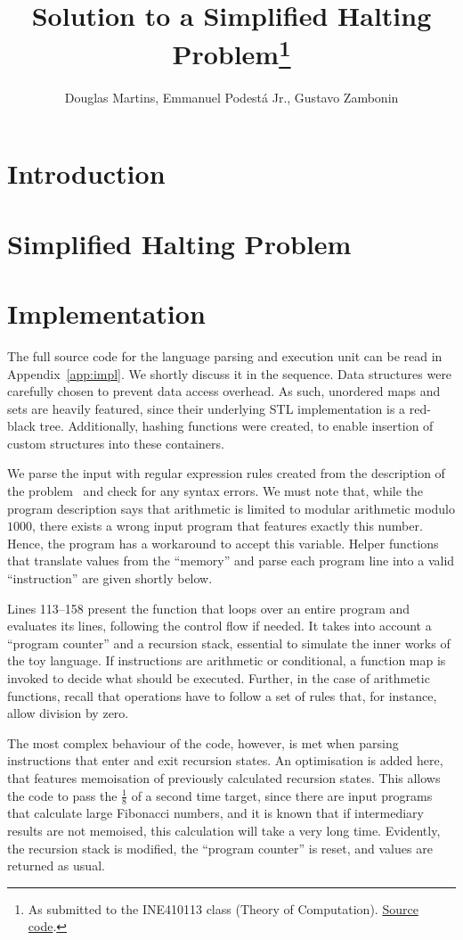 \documentclass[12pt]{article}
\title{Solution to a Simplified Halting Problem\footnote{
    As submitted to the INE410113 class (Theory of Computation). \href{https://github.com/zambonin/ine410113}{Source code}.}}
\author{Douglas Martins\inst{1}, Emmanuel Podestá Jr.\inst{1}, Gustavo Zambonin\inst{1}}
\begin{document}
 

\maketitle

\section{Introduction}\label{sec:intro}

\section{Simplified Halting Problem}\label{sec:halting}

\section{Implementation}\label{sec:imp}

The full source code for the language parsing and execution unit can be read in Appendix~\ref{app:impl}. We shortly discuss it in the sequence. Data structures were carefully chosen to prevent data access overhead. As such, unordered maps and sets are heavily featured, since their underlying STL implementation is a red-black tree. Additionally, hashing functions were created, to enable insertion of custom structures into these containers. 

We parse the input with regular expression rules created from the description of the problem~\cite{} and check for any syntax errors. We must note that, while the program description says that arithmetic is limited to modular arithmetic modulo $1000$, there exists a wrong input program that features exactly this number. Hence, the program has a workaround to accept this variable. Helper functions that translate values from the ``memory'' and parse each program line into a valid ``instruction'' are given shortly below.

Lines 113--158 present the function that loops over an entire program and evaluates its lines, following the control flow if needed. It takes into account a ``program counter'' and a recursion stack, essential to simulate the inner works of the toy language. If instructions are arithmetic or conditional, a function map is invoked to decide what should be executed. Further, in the case of arithmetic functions, recall that operations have to follow a set of rules that, for instance, allow division by zero.

The most complex behaviour of the code, however, is met when parsing instructions that enter and exit recursion states. An optimisation is added here, that features memoisation of previously calculated recursion states. This allows the code to pass the $\frac{1}{8}$ of a second time target, since there are input programs that calculate large Fibonacci numbers, and it is known that if intermediary results are not memoised, this calculation will take a very long time. Evidently, the recursion stack is modified, the ``program counter'' is reset, and values are returned as usual.
\end{document}

